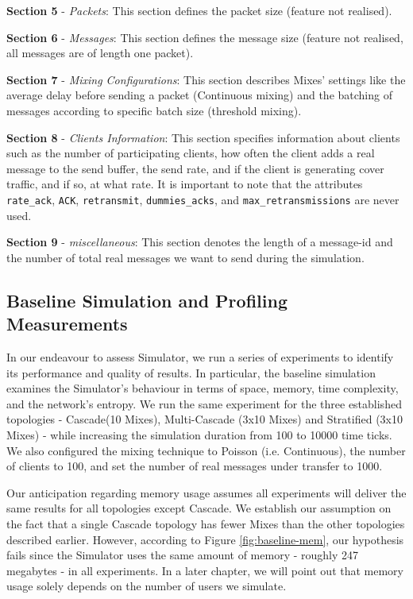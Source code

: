 \documentclass[logo,msc,cyber]{infthesis}   %
\begin{document}
\textbf{Section 5} - \emph{Packets}: This section defines the packet size
(feature not realised).

\textbf{Section 6} - \emph{Messages}: This section defines the message size
(feature not realised, all messages are of length one packet).

\textbf{Section 7} - \emph{Mixing Configurations}: This section describes Mixes'
settings like the average delay before sending a packet (Continuous mixing) and
the batching of messages according to specific batch size (threshold mixing). 
    
\textbf{Section 8} - \emph{Clients Information}: This section specifies
information about clients such as the number of participating clients, how
often the client adds a real message to the send buffer, the send rate, and if
the client is generating cover traffic, and if so, at what rate. It is important
to note that the attributes \texttt{rate\_ack}, \texttt{ACK},
\texttt{retransmit}, \texttt{dummies\_acks}, and \texttt{max\_retransmissions}
are never used. 

\textbf{Section 9} - \emph{miscellaneous}: This section
denotes the length of a message-id and the number of total real messages we
want to send during the simulation.


\subsection{Baseline Simulation and Profiling Measurements}

In our endeavour to assess Simulator, we run a series of experiments to identify
its performance and quality of results. In particular, the baseline simulation
examines the Simulator's behaviour in terms of space, memory, time complexity,
and the network's entropy. We run the same experiment for the three established
topologies - Cascade(10 Mixes), Multi-Cascade (3x10 Mixes) and Stratified (3x10
Mixes) - while increasing the simulation duration from 100 to 10000 time ticks.
We also configured the mixing technique to Poisson (i.e. Continuous), the number
of clients to 100, and set the number of real messages under transfer to 1000. 

Our anticipation regarding memory usage assumes all experiments will deliver the
same results for all topologies except Cascade. We establish our assumption on
the fact that a single Cascade topology has fewer Mixes than the other
topologies described earlier. However, according to Figure
\ref{fig:baseline-mem}, our hypothesis fails since the Simulator uses the same
amount of memory - roughly 247 megabytes - in all experiments. In a later
chapter, we will point out that memory usage solely depends on the number of
users we simulate.
\end{document}
